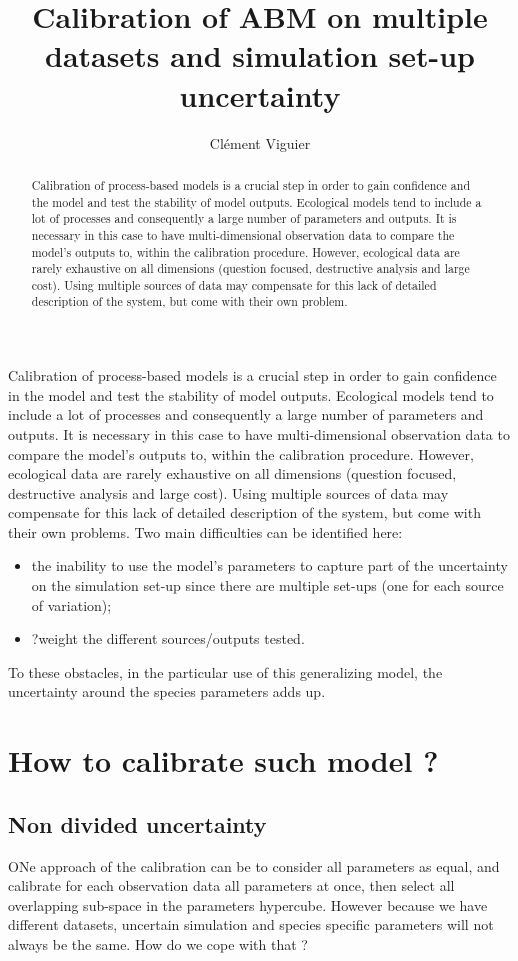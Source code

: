 \documentclass[a4paper, justified,marginals=raggedright]{tufte-handout}
\title{Calibration of ABM on multiple datasets and simulation set-up uncertainty}
\author{Clément Viguier}
\begin{document}
\maketitle
\begin{fullwidth}
\begin{abstract}
\noindent
Calibration of process-based models is a crucial step in order to gain confidence and the model and test the stability of model outputs. Ecological models tend to include a lot of processes and consequently a large number of parameters and outputs. It is necessary in this case to have multi-dimensional observation data to compare the model's outputs to, within the calibration procedure. However, ecological data are rarely exhaustive on all dimensions (question focused, destructive analysis and large cost). Using multiple sources of data may compensate for this lack of detailed description of the system, but come with their own problem. 
\end{abstract}
\end{fullwidth}

Calibration of process-based models is a crucial step in order to gain confidence in the model and test the stability of model outputs. Ecological models tend to include a lot of processes and consequently a large number of parameters and outputs. It is necessary in this case to have multi-dimensional observation data to compare the model's outputs to, within the calibration procedure. However, ecological data are rarely exhaustive on all dimensions (question focused, destructive analysis and large cost). Using multiple sources of data may compensate for this lack of detailed description of the system, but come with their own problems. Two main difficulties can be identified here:
\begin{itemize}
\item the inability to use the model's parameters to capture part of the uncertainty on the simulation set-up since there are multiple set-ups (one for each source of variation);
\item ?weight the different sources/outputs tested.
\end{itemize}
To these obstacles, in the particular use of this generalizing model, the uncertainty around the species parameters adds up.


\section{How to calibrate such model ?}
\subsection{Non divided uncertainty}
ONe approach of the calibration can be to consider all parameters as equal, and calibrate for each observation data all parameters at once, then select all overlapping sub-space in the parameters hypercube. However because we have different datasets, uncertain simulation and species specific parameters will not always be the same. How do we cope with that ?
\end{document}
